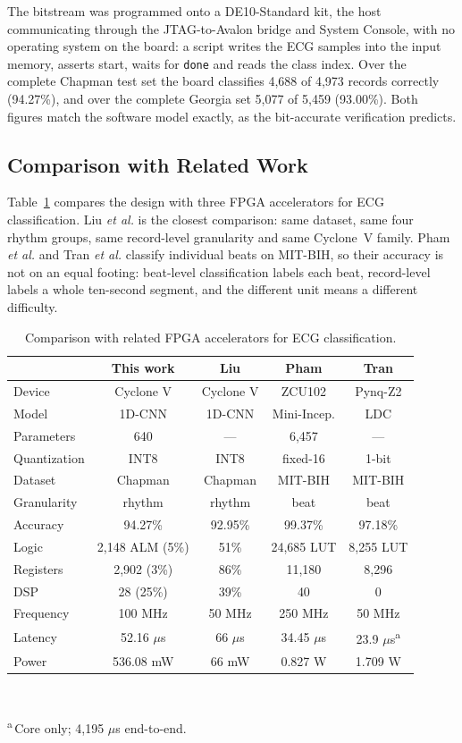 \documentclass[conference,10pt]{IEEEtran}
\begin{document}
The bitstream was programmed onto a DE10-Standard kit, the host communicating
through the JTAG-to-Avalon bridge and System Console, with no operating system on
the board: a script writes the ECG samples into the input memory, asserts start,
waits for \texttt{done} and reads the class index. Over the complete Chapman test
set the board classifies 4{,}688 of 4{,}973 records correctly (94.27\%), and over
the complete Georgia set 5{,}077 of 5{,}459 (93.00\%). Both figures match the
software model exactly, as the bit-accurate verification predicts.

\subsection{Comparison with Related Work}

Table~\ref{tab:sota} compares the design with three FPGA accelerators for ECG
classification. Liu \emph{et al.} \cite{liu2023} is the closest comparison: same
dataset, same four rhythm groups, same record-level granularity and same
Cyclone~V family. Pham \emph{et al.} \cite{pham2025} and Tran \emph{et al.}
\cite{tran2026} classify individual beats on MIT-BIH, so their accuracy is not on
an equal footing: beat-level classification labels each beat, record-level labels
a whole ten-second segment, and the different unit means a different difficulty.

\begin{table}[t]
\caption{Comparison with related FPGA accelerators for ECG classification.}
\label{tab:sota}
\centering
\scriptsize
\setlength{\tabcolsep}{3pt}
\begin{tabular}{lcccc}
\toprule
 & \textbf{This work} & Liu \cite{liu2023} & Pham \cite{pham2025} & Tran \cite{tran2026} \\
\midrule
Device      & Cyclone V & Cyclone V & ZCU102 & Pynq-Z2 \\
Model       & 1D-CNN & 1D-CNN & Mini-Incep. & LDC \\
Parameters  & 640 & --- & 6{,}457 & --- \\
Quantization& INT8 & INT8 & fixed-16 & 1-bit \\
Dataset     & Chapman & Chapman & MIT-BIH & MIT-BIH \\
Granularity & rhythm & rhythm & beat & beat \\
Accuracy    & 94.27\% & 92.95\% & 99.37\% & 97.18\% \\
Logic       & 2{,}148 ALM (5\%) & 51\% & 24{,}685 LUT & 8{,}255 LUT \\
Registers   & 2{,}902 (3\%) & 86\% & 11{,}180 & 8{,}296 \\
DSP         & 28 (25\%) & 39\% & 40 & 0 \\
Frequency   & 100 MHz & 50 MHz & 250 MHz & 50 MHz \\
Latency     & 52.16 $\mu$s & 66 $\mu$s & 34.45 $\mu$s & 23.9 $\mu$s\textsuperscript{a} \\
Power       & 536.08 mW & 66 mW & 0.827 W & 1.709 W \\
\bottomrule
\end{tabular}
\\[2pt]
\raggedright\textsuperscript{a}\,Core only; 4{,}195 $\mu$s end-to-end.
\end{table}
\end{document}
